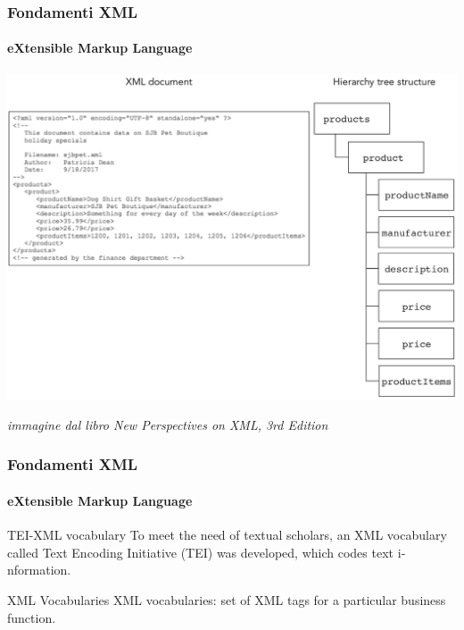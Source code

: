 \begin{frame}
	\frametitle{Fondamenti XML}
	\framesubtitle{eXtensible Markup Language}
	\addtocounter{nframe}{1}

	\begin{center}
		\includegraphics[width=.9\textwidth]{imgs/XML-TreeStructure.png}
	\end{center}

\begin{tiny}\textit{immagine dal libro New Perspectives on XML, 3rd Edition}\end{tiny}

\end{frame}

\begin{frame}
	\frametitle{Fondamenti XML}
	\framesubtitle{eXtensible Markup Language}
	\addtocounter{nframe}{1}

	\begin{block}{TEI-XML vocabulary}
		To meet the need of textual scholars, an XML ­vocabulary called Text Encoding Initiative (TEI) was developed, which codes text i­nformation.
	\end{block}

	\begin{block}{XML Vocabularies}
		XML vocabularies:  set of XML tags for a particular business function.
	\end{block}

\end{frame}


